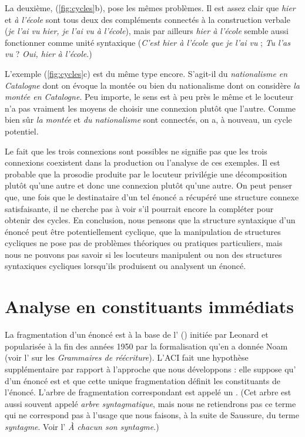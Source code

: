 {La deuxième, (\ref{fig:cycles}b), pose les mêmes problèmes. Il est assez clair que \textit{hier} et \textit{à l’école} sont tous deux des compléments connectés à la construction verbale (\textit{je l’ai vu hier, je l’ai vu à l’école}), mais par ailleurs \textit{hier à l’école} semble aussi fonctionner comme unité syntaxique (\textit{C’est hier à l’école que je l’ai vu} ; \textit{Tu l’as vu} ? \textit{Oui, hier à l’école}.)

L'exemple (\ref{fig:cycles}c) est du même type encore. S’agit-il du \textit{nationalisme en Catalogne} dont on évoque la montée ou bien du nationalisme dont on considère \textit{la montée en Catalogne}. Peu importe, le sens est à peu près le même et le locuteur n’a pas vraiment les moyens de choisir une connexion plutôt que l’autre. Comme bien sûr \textit{la montée} et \textit{du nationalisme} sont connectés, on a, à nouveau, un cycle potentiel.

Le fait que les trois connexions sont possibles ne signifie pas que les trois connexions coexistent dans la production ou l’analyse de ces exemples. Il est probable que la prosodie produite par le locuteur privilégie une décomposition plutôt qu’une autre et donc une connexion plutôt qu’une autre. On peut penser que, une fois que le destinataire d’un tel énoncé a récupéré une structure connexe satisfaisante, il ne cherche pas à voir s’il pourrait encore la compléter pour obtenir des cycles. En conclusion, nous pensons que la structure syntaxique d’un énoncé peut être potentiellement cyclique, que la manipulation de structures cycliques ne pose pas de problèmes théoriques ou pratiques particuliers, mais nous ne pouvons pas savoir si les locuteurs manipulent ou non des structures syntaxiques cycliques lorsqu’ils produisent ou analysent un énoncé.
}
\section{Analyse en constituants immédiats}\label{sec:3.2.25}

La fragmentation d’un énoncé est à la base de l’ () initiée par Leonard \citet{bloomfield1933language} et popularisée à la fin des années 1950 par la formalisation qu’en a donnée Noam \citet{chomsky1957syntactic} (voir l’ sur les \textit{Grammaires de réécriture}). L’ACI fait une hypothèse supplémentaire par rapport à l’approche que nous développons : elle suppose qu’ d’un énoncé est  et que cette unique fragmentation définit les constituants de l’énoncé. L’arbre de fragmentation correspondant est appelé un . (Cet arbre est aussi souvent appelé \textit{arbre syntagmatique}, mais nous ne retiendrons pas ce terme qui ne correspond pas à l’usage que nous faisons, à la suite de Saussure, du terme \textit{syntagme}. Voir l’ \textit{À chacun son syntagme}.)

